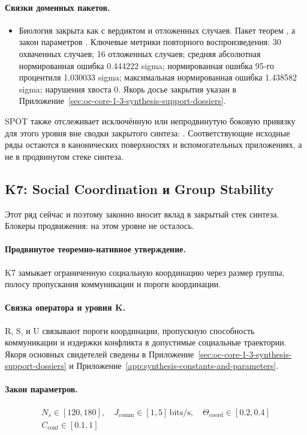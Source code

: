 \paragraph{Связки доменных пакетов.}
\begin{itemize}[leftmargin=1.6em,nosep]
\item Биология закрыта как  с вердиктом  и  отложенных случаев. Пакет теорем , а закон параметров . Ключевые метрики повторного воспроизведения: 30 охваченных случаев; 16 отложенных случаев; средняя абсолютная нормированная ошибка 0.444222 sigma; нормированная ошибка 95-го процентиля 1.030033 sigma; максимальная нормированная ошибка 1.438582 sigma; нарушения хвоста 0. Якорь досье закрытия указан в Приложение~\ref{sec:oc-core-1-3-synthesis-support-dossiers}.
\end{itemize}
SPOT также отслеживает  исключённую или непродвинутую боковую привязку для этого уровня вне сводки закрытого синтеза: . Соответствующие исходные ряды остаются в канонических поверхностях и вспомогательных приложениях, а не в продвинутом стеке синтеза.

\subsection{K7: Social Coordination и Group Stability}
\label{sec:oc-core-1-3-synthesis-k7}
Этот ряд сейчас  и поэтому законно вносит вклад в закрытый стек синтеза.
Блокеры продвижения: на этом уровне не осталось.

\paragraph{Продвинутое теоремно-нативное утверждение.}
K7 замыкает ограниченную социальную координацию через размер группы, полосу пропускания коммуникации и пороги координации.

\paragraph{Связка оператора и уровня K.}
R, S, и U связывают пороги координации, пропускную способность коммуникации и издержки конфликта в допустимые социальные траектории.
Якоря основных свидетелей сведены в Приложение~\ref{sec:oc-core-1-3-synthesis-support-dossiers} и Приложение~\ref{app:synthesis-constants-and-parameters}.

\paragraph{Закон параметров.}
\[
\begin{gathered} N_s \in [120,180],\quad J_{\mathrm{comm}} \in [1,5]\,\mathrm{bits/s},\quad \Theta_{\mathrm{coord}} \in [0.2,0.4] \\ C_{\mathrm{conf}} \in [0.1,1] \end{gathered}
\]

